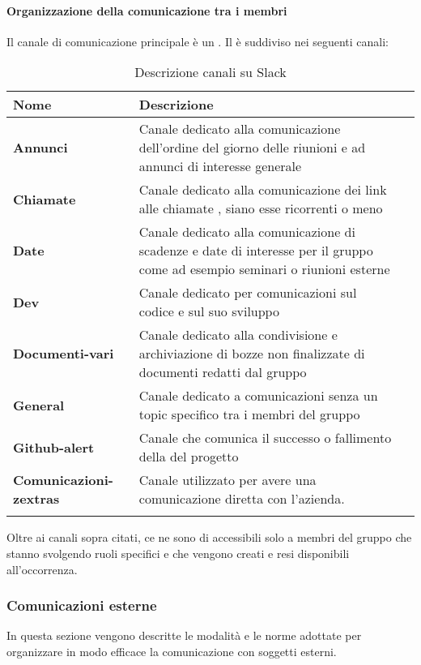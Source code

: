 \paragraph*{Organizzazione della comunicazione tra i membri }
Il canale di comunicazione principale è un  .
Il  è suddiviso nei seguenti canali:

\setlength{\freewidth}{\dimexpr\textwidth-0\tabcolsep}
	\renewcommand{\arraystretch}{1.5}
	\setlength{\aboverulesep}{0pt}
	\setlength{\belowrulesep}{0pt}
	\begin{longtable}{L{.210\freewidth} L{.6\freewidth} L{.080\freewidth}}
		\textbf{Nome} & \textbf{Descrizione} \\
		\toprule
		\endhead		
		\textbf{Annunci} & Canale dedicato alla comunicazione dell'ordine del giorno delle riunioni e ad annunci di interesse generale \\
		\textbf{Chiamate} & Canale dedicato alla comunicazione dei link alle chiamate , siano esse ricorrenti o meno \\
		 \textbf{Date} & Canale dedicato alla comunicazione di scadenze e date di interesse per il gruppo come ad esempio seminari o riunioni esterne \\
		 \textbf{Dev} & Canale dedicato per comunicazioni sul codice e sul suo sviluppo \\
		\textbf{Documenti-vari} & Canale dedicato alla condivisione e archiviazione di bozze non finalizzate di documenti redatti dal gruppo \\
		 \textbf{General} & Canale dedicato a comunicazioni senza un topic specifico tra i membri del gruppo \\
		 \textbf{Github-alert} & Canale che comunica il successo o fallimento della  del progetto \\
		 \textbf{Comunicazioni-zextras} & Canale utilizzato per avere una comunicazione diretta con l'azienda. \\
		\bottomrule
		\hiderowcolors
		\caption{Descrizione canali su Slack}
	\end{longtable}
Oltre ai canali sopra citati, ce ne sono di accessibili solo a membri del gruppo che stanno svolgendo ruoli specifici e che vengono creati e resi disponibili all'occorrenza.
\subsubsection{Comunicazioni esterne}
In questa sezione vengono descritte le modalità e le norme adottate per organizzare in modo efficace la comunicazione con soggetti esterni.
